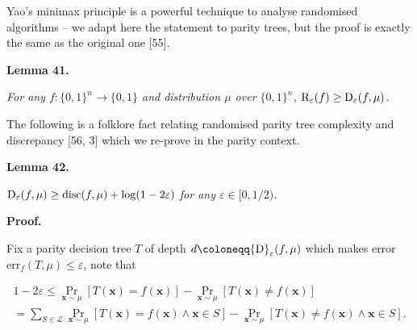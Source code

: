Yao’s minimax principle is a powerful technique to analyse randomised algorithms – we adapt here the statement to parity trees, but the proof is exactly the same as the original one [55].\par





\par\medskip\noindent\textbf{
\textbf{Lemma 41}\textbf{.}
}\par



\emph{For any $f\colon\{0,1\}^{n}\to\{0,1\}$ and distribution $\mu$ over $\{0,1\}^{n}$, ${\textup{R}}_{\varepsilon}(f)\geq{\textup{D}}_{\varepsilon}(f,\mu)$.}\par






The following is a folklore fact relating randomised parity tree complexity and discrepancy [56, 3] which we re-prove in the parity context.\par





\par\medskip\noindent\textbf{
\textbf{Lemma 42}\textbf{.}
}\par



${\textup{D}}_{\varepsilon}(f,\mu)\geq{\textup{disc}}(f,\mu)+\log(1-2\varepsilon)$\emph{ for any $\varepsilon\in[0,1/2)$.}\par






\par\medskip\noindent\textbf{Proof.}\par




Fix a parity decision tree $T$ of depth $d\coloneqq{\textup{D}}_{\varepsilon}(f,\mu)$ which makes error $\mathrm{err}_{f}(T,\mu)\leq\varepsilon$, note that\par


\[\begin{gathered}
\displaystyle 1-2\varepsilon \displaystyle\leq\Pr_{\bm{x}\sim\mu}[T(\bm{x})=f(\bm{x})]-\Pr_{\bm{x}\sim\mu}[T(\bm{x})\neq f(\bm{x})] \\
\displaystyle=\sum\nolimits_{S\in\mathcal{L}}\Pr_{\bm{x}\sim\mu}[T(\bm{x})=f(\bm{x})\wedge\bm{x}\in S]-\Pr_{\bm{x}\sim\mu}[T(\bm{x})\neq f(\bm{x})\wedge\bm{x}\in S].
\end{gathered}\]



